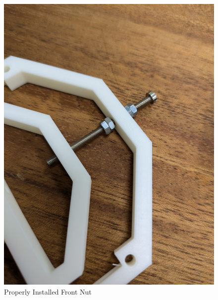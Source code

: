 \documentclass[runningheads]{llncs}
\begin{document}
\begin{figure}[h]
    \centering
    \begin{minipage}[b]{0.45\textwidth}
        \centering
        \includegraphics[width=\textwidth]{images/front_nut.jpg} %
        \caption{Properly Installed Front Nut }
    \end{minipage}
    \hfill
    \begin{minipage}[b]{0.45\textwidth}
        \centering

\end{minipage}
\end{figure}
\end{document}
